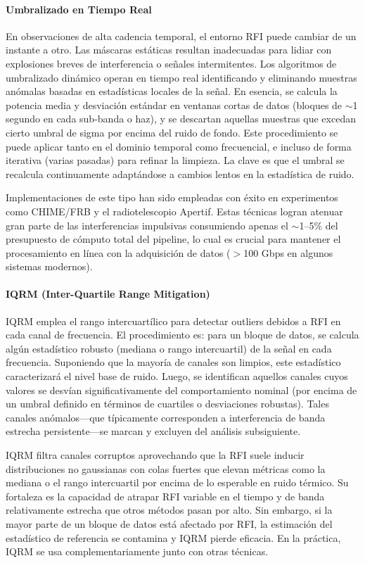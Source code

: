 \paragraph{Umbralizado en Tiempo Real}

En observaciones de alta cadencia temporal, el entorno RFI puede cambiar de un instante a otro. Las máscaras estáticas resultan inadecuadas para lidiar con explosiones breves de interferencia o señales intermitentes. Los algoritmos de umbralizado dinámico operan en tiempo real identificando y eliminando muestras anómalas basadas en estadísticas locales de la señal. En esencia, se calcula la potencia media y desviación estándar en ventanas cortas de datos (bloques de $\sim$1 segundo en cada sub-banda o haz), y se descartan aquellas muestras que excedan cierto umbral de sigma por encima del ruido de fondo. Este procedimiento se puede aplicar tanto en el dominio temporal como frecuencial, e incluso de forma iterativa (varias pasadas) para refinar la limpieza. La clave es que el umbral se recalcula continuamente adaptándose a cambios lentos en la estadística de ruido.

Implementaciones de este tipo han sido empleadas con éxito en experimentos como CHIME/FRB y el radiotelescopio Apertif. Estas técnicas logran atenuar gran parte de las interferencias impulsivas consumiendo apenas el $\sim$1--5\% del presupuesto de cómputo total del pipeline, lo cual es crucial para mantener el procesamiento en línea con la adquisición de datos ($>$100 Gbps en algunos sistemas modernos).

\paragraph{IQRM (Inter-Quartile Range Mitigation)}

IQRM emplea el rango intercuartílico para detectar outliers debidos a RFI en cada canal de frecuencia. El procedimiento es: para un bloque de datos, se calcula algún estadístico robusto (mediana o rango intercuartil) de la señal en cada frecuencia. Suponiendo que la mayoría de canales son limpios, este estadístico caracterizará el nivel base de ruido. Luego, se identifican aquellos canales cuyos valores se desvían significativamente del comportamiento nominal (por encima de un umbral definido en términos de cuartiles o desviaciones robustas). Tales canales anómalos—que típicamente corresponden a interferencia de banda estrecha persistente—se marcan y excluyen del análisis subsiguiente.

IQRM filtra canales corruptos aprovechando que la RFI suele inducir distribuciones no gaussianas con colas fuertes que elevan métricas como la mediana o el rango intercuartil por encima de lo esperable en ruido térmico. Su fortaleza es la capacidad de atrapar RFI variable en el tiempo y de banda relativamente estrecha que otros métodos pasan por alto. Sin embargo, si la mayor parte de un bloque de datos está afectado por RFI, la estimación del estadístico de referencia se contamina y IQRM pierde eficacia. En la práctica, IQRM se usa complementariamente junto con otras técnicas.


